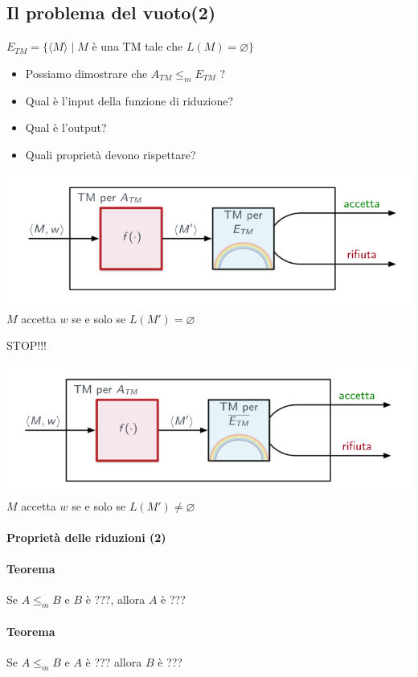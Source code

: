 \subsection{Il problema del vuoto(2)}
$E_{TM}=\{\langle M\rangle\mid M$ è una TM tale che $L(M)=\varnothing\}$ 
\begin{itemize}
	\item Possiamo dimostrare che $A_{TM}\leq_m E_{TM}$ ?
	\item Qual è l'input della funzione di riduzione? 
	\item Qual è l'output? 
	\item Quali proprietà devono rispettare? 
\end{itemize}
\includegraphics[scale=0.5]{img/schema_atm_etm.png}
$M$ accetta $w$ se e solo se $L(M')=\varnothing$ 
\begin{center}
	{\Large STOP!!!}
\end{center}
\includegraphics[scale=0.5]{img/schema_atm_etm_2.png}
$M$ accetta $w$ se e solo se $L(M') \neq \varnothing$ 
\paragraph{Proprietà delle riduzioni (2)}
\paragraph{Teorema}
Se $A\leq_m B$ e $B$ è ???, allora $A$  è ??? 
\paragraph{Teorema}
Se $A\leq_m B$ e $A$ è ???  allora $B$ è ??? 
